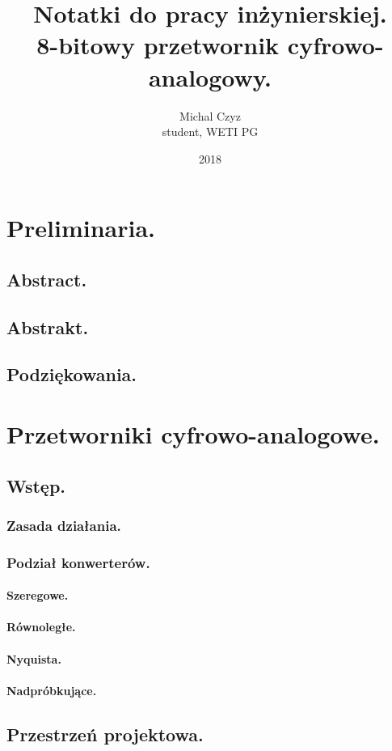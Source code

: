 \documentclass[10pt,a4paper]{report}
\title{Notatki do pracy inżynierskiej. \\ 8-bitowy przetwornik cyfrowo-analogowy.}
\date{2018}
\author{Michal Czyz \\ student, WETI PG\\}
\begin{document}
	\maketitle
	
	\tableofcontents
	\newpage
	\chapter{Preliminaria.}
	\section{Abstract.}
	\section{Abstrakt.}
	\section{Podziękowania.}
	
	\chapter{Przetworniki cyfrowo-analogowe.}
	\section{Wstęp.}
	\subsection{Zasada działania.}
	\subsection{Podział konwerterów.}
	\subsubsection{Szeregowe.}
	\subsubsection{Równoległe.}
	\subsubsection{Nyquista.}
	\subsubsection{Nadpróbkujące.}
	
	\section{Przestrzeń projektowa.}
\end{document}

